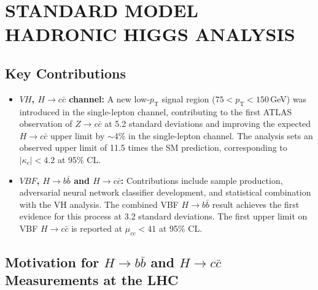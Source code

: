 \begingroup
\clearpage%
\let\clearpage\relax%
\vspace*{-16pt}%
\chapter[STANDARD MODEL HADRONIC HIGGS ANALYSIS]{STANDARD MODEL HADRONIC HIGGS ANALYSIS}\label{chap:higgs}
\endgroup

\section{Key Contributions}

\begin{itemize}
    \item \textbf{$VH$, $H \rightarrow c\bar{c}$ channel:} A new low-$p_\mathrm{T}$ signal
    region ($75 < p_\mathrm{T} < 150$\,GeV) was introduced in the single-lepton channel,
    contributing to the first ATLAS observation of $Z \rightarrow c\bar{c}$ at 5.2 standard
    deviations and improving the expected $H \rightarrow c\bar{c}$ upper limit by $\sim$4\% in the single-lepton channel.
    The analysis sets an observed upper limit of 11.5 times the SM prediction, corresponding
    to $|\kappa_c| < 4.2$ at 95\% CL.

    \item \textbf{$VBF$, $H \rightarrow b\bar{b}$ and $H \rightarrow c\bar{c}$:} Contributions
    include sample production, adversarial neural network classifier development, and
    statistical combination with the VH analysis.
    The combined VBF $H \rightarrow b\bar{b}$ result achieves the first evidence for this
    process at 3.2 standard deviations.
    The first upper limit on VBF $H \rightarrow c\bar{c}$ is reported at $\mu_{cc} < 41$
    at 95\% CL.
\end{itemize}

\section{Motivation for \texorpdfstring{$H \rightarrow b\bar{b}$}{H→bb} and \texorpdfstring{$H \rightarrow c\bar{c}$}{H→cc} Measurements at the LHC}

